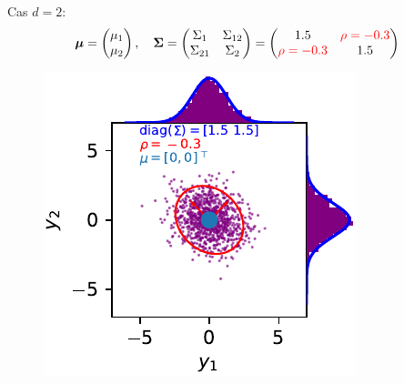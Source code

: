 \documentclass[xcolor=svgnames, t]{beamer}
\newcommand{\vectorx}[1]{\boldsymbol{\MakeLowercase{\mathbf{#1}}}}
\newcommand{\matrixx}[1]{\boldsymbol{\MakeUppercase{#1}}}
\begin{document}
\begin{frame}
  Cas $d=2$:
  \begin{equation*}
    \vectorx{\mu}
    =
    \begin{pmatrix}
      \mu_1 \\
      \mu_2
    \end{pmatrix},
    \quad
    \matrixx{\Sigma}
    =
      \begin{pmatrix}
        \Sigma_{1} & \Sigma_{12} \\
        \Sigma_{21} & \Sigma_{2}
      \end{pmatrix}
    =
      \begin{pmatrix}
        1.5 & \color{red}\rho = -0.3 \\
        \color{red}\rho = -0.3 & 1.5
      \end{pmatrix}
  \end{equation*}
% 
  \begin{figure}
    \includegraphics{gaussian_2d_rho_low.pdf}
  \end{figure}
\end{frame}
\end{document}
